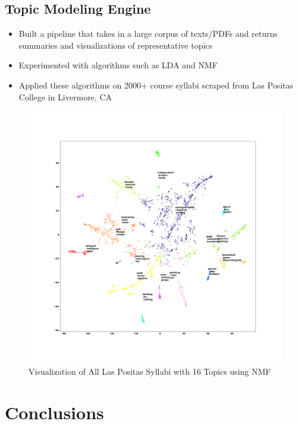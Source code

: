 \documentclass[clinic]{hmcposter}
\begin{document}
\begin{poster}
\subsection{Topic Modeling Engine}%
\begin{itemize}
    \item Built a pipeline that takes in a large corpus of texts/PDFs and returns summaries and visualizations of representative topics
    \item Experimented with algorithms such as LDA and NMF
    \item Applied these algorithms on 2000+ course syllabi scraped from Las Positas College in Livermore, CA
\end{itemize}

\begin{center}
\begin{figure}
    \includegraphics[scale = 0.66]{nmf_16.png}
       \caption[]{Visualization of All Las Positas Syllabi with 16 Topics using NMF}%
\end{figure}
\end{center}





\section{Conclusions}


\end{poster}
\end{document}
